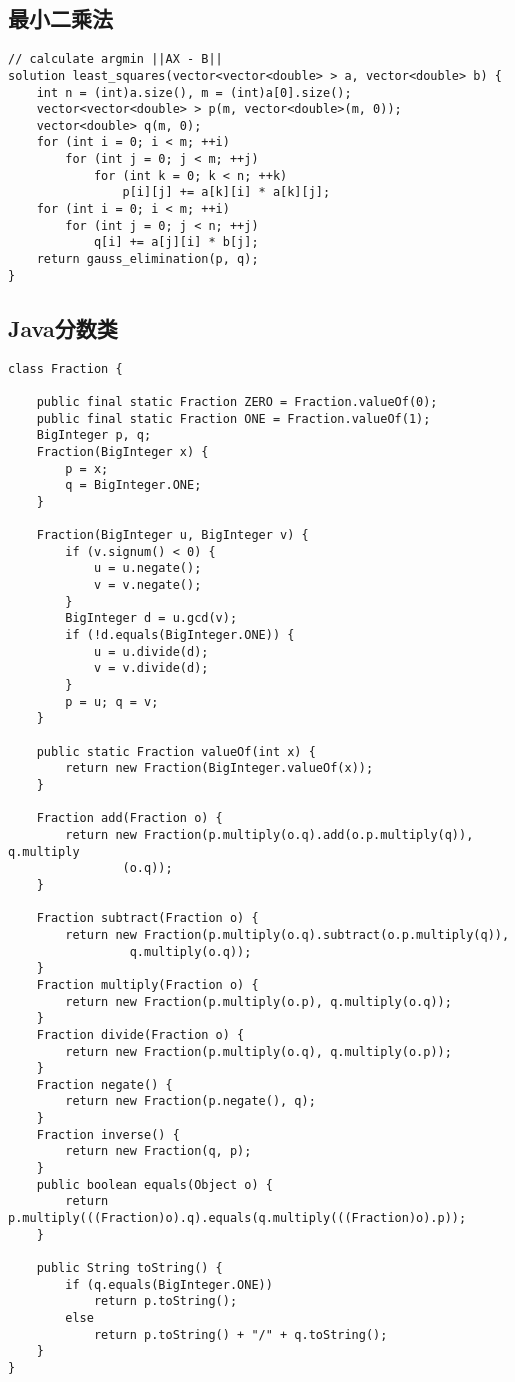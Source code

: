\documentclass{article}
\begin{document}
\subsection{最小二乘法}

\begin{lstlisting}
// calculate argmin ||AX - B||
solution least_squares(vector<vector<double> > a, vector<double> b) {
    int n = (int)a.size(), m = (int)a[0].size();
    vector<vector<double> > p(m, vector<double>(m, 0));
    vector<double> q(m, 0);
    for (int i = 0; i < m; ++i)
        for (int j = 0; j < m; ++j)
            for (int k = 0; k < n; ++k)
                p[i][j] += a[k][i] * a[k][j];
    for (int i = 0; i < m; ++i)
        for (int j = 0; j < n; ++j)
            q[i] += a[j][i] * b[j];
    return gauss_elimination(p, q);
}
\end{lstlisting}

\subsection{Java分数类}

\begin{lstlisting}
class Fraction {

    public final static Fraction ZERO = Fraction.valueOf(0);
    public final static Fraction ONE = Fraction.valueOf(1);
    BigInteger p, q;
    Fraction(BigInteger x) {
        p = x;
        q = BigInteger.ONE;
    }

    Fraction(BigInteger u, BigInteger v) {
        if (v.signum() < 0) {
            u = u.negate();
            v = v.negate();
        }
        BigInteger d = u.gcd(v);
        if (!d.equals(BigInteger.ONE)) {
            u = u.divide(d);
            v = v.divide(d);
        }
        p = u; q = v;
    }

    public static Fraction valueOf(int x) {
        return new Fraction(BigInteger.valueOf(x));
    }

    Fraction add(Fraction o) {
        return new Fraction(p.multiply(o.q).add(o.p.multiply(q)), q.multiply
                (o.q));
    }

    Fraction subtract(Fraction o) {
        return new Fraction(p.multiply(o.q).subtract(o.p.multiply(q)),
                 q.multiply(o.q));
    }
    Fraction multiply(Fraction o) {
        return new Fraction(p.multiply(o.p), q.multiply(o.q));
    }
    Fraction divide(Fraction o) {
        return new Fraction(p.multiply(o.q), q.multiply(o.p));
    }
    Fraction negate() {
        return new Fraction(p.negate(), q);
    }
    Fraction inverse() {
        return new Fraction(q, p);
    }
    public boolean equals(Object o) {
        return p.multiply(((Fraction)o).q).equals(q.multiply(((Fraction)o).p));
    }

    public String toString() {
        if (q.equals(BigInteger.ONE))
            return p.toString();
        else
            return p.toString() + "/" + q.toString();
    }
}
\end{lstlisting}
\end{document}
